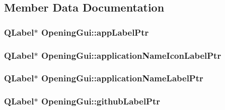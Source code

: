 \subsection{Member Data Documentation}
\hypertarget{class_opening_gui_a774269567530a475bbd5f5fb485ee023}{
\subsubsection[{app\-Label\-Ptr}]{\setlength{\rightskip}{0pt plus 5cm}Q\-Label$\ast$ Opening\-Gui\-::app\-Label\-Ptr\hspace{0.3cm}{\ttfamily [private]}}}\label{class_opening_gui_a774269567530a475bbd5f5fb485ee023}
\hypertarget{class_opening_gui_acdfc9f6f1c81e877a3837afcdfba7875}{
\subsubsection[{application\-Name\-Icon\-Label\-Ptr}]{\setlength{\rightskip}{0pt plus 5cm}Q\-Label$\ast$ Opening\-Gui\-::application\-Name\-Icon\-Label\-Ptr\hspace{0.3cm}{\ttfamily [private]}}}\label{class_opening_gui_acdfc9f6f1c81e877a3837afcdfba7875}
\hypertarget{class_opening_gui_a14f81e2da5ce61335a154282bc1ba581}{
\subsubsection[{application\-Name\-Label\-Ptr}]{\setlength{\rightskip}{0pt plus 5cm}Q\-Label$\ast$ Opening\-Gui\-::application\-Name\-Label\-Ptr\hspace{0.3cm}{\ttfamily [private]}}}\label{class_opening_gui_a14f81e2da5ce61335a154282bc1ba581}
\hypertarget{class_opening_gui_acc1cfdb1e87e6289a9196cfab6ff36bf}{
\subsubsection[{github\-Label\-Ptr}]{\setlength{\rightskip}{0pt plus 5cm}Q\-Label$\ast$ Opening\-Gui\-::github\-Label\-Ptr\hspace{0.3cm}{\ttfamily [private]}}}\label{class_opening_gui_acc1cfdb1e87e6289a9196cfab6ff36bf}
